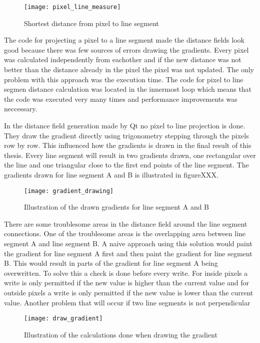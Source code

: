 \begin{figure}[H]
\texttt{[image: pixel\_line\_measure]}
\caption{Shortest distance from pixel to line segment}
\end{figure}

The code for projecting a pixel to a line segment made the distance fields look good because there was few sources of errors drawing the gradients. Every pixel was calculated independently from eachother and if the new distance was not better than the distance already in the pixel the pixel was not updated. The only problem with this approach was the execution time. The code for pixel to line segmen distance calculation was located in the innermost loop which means that the code was executed very many times and performance improvements was neccessary.

In the distance field generation made by Qt no pixel to line projection is done. They draw the gradient directly using trigonometry stepping through the pixels row by row. This influenced how the gradients is drawn in the final result of this thesis. Every line segment will result in two gradients drawn, one rectangular over the line and one triangular close to the first end points of the line segment. The gradients drawn for line segment A and B is illustrated in figureXXX.

\begin{figure}[H]
\texttt{[image: gradient\_drawing]}
\caption{Illustration of the drawn gradients for line segment A and B}
\end{figure}

There are some troublesome areas in the distance field around the line segment connections. One of the troublesome areas is the overlapping area between line segment A and line segment B. A naive approach using this solution would paint the gradient for line segment A first and then paint the gradient for line segment B. This would result in parts of the gradient for line segment A being overwritten. To solve this a check is done before every write. For inside pixels a write is only permitted if the new value is higher than the current value and for outside pixels a write is only permitted if the new value is lower than the current value. Another problem that will occur if two line segments is not perpendicular

\begin{figure}[H]
\texttt{[image: draw\_gradient]}
\caption{Illustration of the calculations done when drawing the gradient}
\end{figure}

